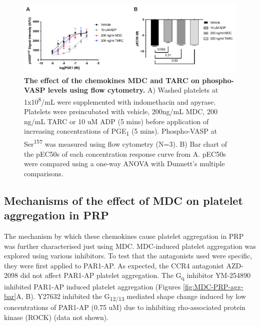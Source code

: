 \documentclass[11pt,twoside]{bristolthesis}
\begin{document}
\begin{figure}

{\centering \includegraphics[width=0.9\linewidth]{figure/Chemokines/Layouts/MDC_TARC_VASP_FACS_logec50} 

}

\caption[The effect of the chemokines MDC and TARC on phospho-VASP levels using flow cytometry]{\textbf{The effect of the chemokines MDC and TARC on phospho-VASP levels using flow cytometry.} A) Washed platelets at 1x10\textsuperscript{8}/mL were supplemented with indomethacin and apyrase. Platelets were preincubated with vehicle, 200ng/mL MDC, 200 ng/mL TARC or 10 uM ADP (5 mins) before application of increasing concentrations of PGE\textsubscript{1} (5 mins). Phospho-VASP at Ser\textsuperscript{157} was measured using flow cytometry (N=3). B) Bar chart of the pEC50s of each concentration response curve from A. pEC50s were compared using a one-way ANOVA with Dunnett's multiple comparisons.}\label{fig:MDC-TARC-VASP-FACS}
\end{figure}
\hypertarget{mechanisms-of-the-effect-of-mdc-on-platelet-aggregation-in-prp}{%
\subsection{Mechanisms of the effect of MDC on platelet aggregation in PRP}\label{mechanisms-of-the-effect-of-mdc-on-platelet-aggregation-in-prp}}

The mechanism by which these chemokines cause platelet aggregation in PRP was further characterised just using MDC. MDC-induced platelet aggregation was explored using various inhibitors. To test that the antagonists used were specific, they were first applied to PAR1-AP. As expected, the CCR4 antagonist AZD-2098 did not affect PAR1-AP platelet aggregation. The G\textsubscript{q} inhibitor YM-254890 inhibited PAR1-AP induced platelet aggregation (Figures \ref{fig:MDC-PRP-agg-bar}A, B). Y27632 inhibited the G\textsubscript{12/13} mediated shape change induced by low concentrations of PAR1-AP (0.75 uM) due to inhibiting rho-associated protein kinase (ROCK) (data not shown).
\end{document}
